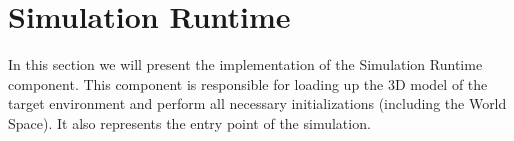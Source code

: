 \section{Simulation Runtime} %
\label{sec:impl_simulation_runtime}
In this section we will present the implementation of the Simulation Runtime component. This component is responsible for loading up the 3D model of the target environment and perform all necessary initializations (including the World Space). It also represents the entry point of the simulation.\\


